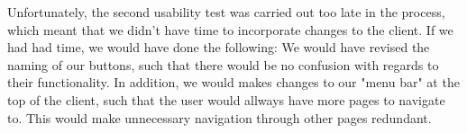 Unfortunately, the second usability test was carried out too late in the process, which meant that we didn't have time to incorporate changes to the client. If we had had time, we would have done the following: We would have revised the naming of our buttons, such that there would be no confusion with regards to their functionality. In addition, we would makes changes to our "menu bar" at the top of the client, such that the user would allways have more pages to navigate to. This would make unnecessary navigation through other pages redundant.
